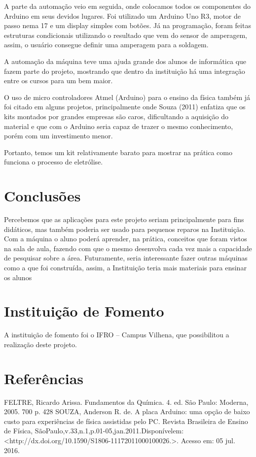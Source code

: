 \documentclass[article,12pt,onesidea,4paper,english,brazil]{abntex2}
\begin{document}
A parte da automação veio em seguida, onde colocamos todos os
componentes do Arduino em seus devidos lugares. Foi utilizado um Arduino
Uno R3, motor de passo nema 17 e um display simples com botões. Já na
programação, foram feitas estruturas condicionais utilizando o resultado que
vem do sensor de amperagem, assim, o usuário consegue definir uma
amperagem para a soldagem.

A automação da máquina teve uma ajuda grande dos alunos de
informática que fazem parte do projeto, mostrando que dentro da instituição há
uma integração entre os cursos para um bem maior.

O uso de micro controladores Atmel (Arduino) para o ensino da física
também já foi citado em alguns projetos, principalmente onde Souza (2011)
enfatiza que os kits montados por grandes empresas são caros, dificultando a
aquisição do material e que com o Arduino seria capaz de trazer o mesmo
conhecimento, porém com um investimento menor.

Portanto, temos um kit relativamente barato para mostrar na prática como
funciona o processo de eletrólise.

	\section*{Conclusões}
	
	Percebemos que as aplicações para este projeto seriam principalmente para
	fins didáticos, mas também poderia ser usado para pequenos reparos na Instituição.
	Com a máquina o aluno poderá aprender, na prática, conceitos que foram vistos na
	sala de aula, fazendo com que o mesmo desenvolva cada vez mais a capacidade de
	pesquisar sobre a área. Futuramente, seria interessante fazer outras máquinas
	como a que foi construída, assim, a Instituição teria mais materiais para ensinar os
	alunos

	\section*{Instituição de Fomento}
	A instituição de fomento foi o IFRO – Campus Vilhena, que possibilitou a
	realização deste projeto.
	
	\section*{Referências}
	
	\noindent FELTRE, Ricardo Arissa. Fundamentos da Química. 4. ed. São Paulo: Moderna,
	2005. 700 p. 428
	SOUZA, Anderson R. de. A placa Arduino: uma opção de baixo custo para
	experiências de física assistidas pelo PC. Revista Brasileira de Ensino de
	Física, SãoPaulo,v.33,n.1,p.01-05,jan.2011.Disponívelem:
	<http://dx.doi.org/10.1590/S1806-11172011000100026.>. Acesso em: 05 jul. 2016.
\end{document}
